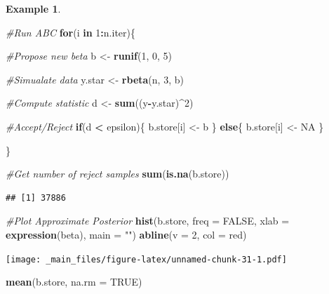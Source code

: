 \documentclass[
]{book}
\newenvironment{Shaded}{\begin{snugshade}}{\end{snugshade}}
\newcommand{\AttributeTok}[1]{\textcolor[rgb]{0.13,0.29,0.53}{#1}}
\newcommand{\CommentTok}[1]{\textcolor[rgb]{0.56,0.35,0.01}{\textit{#1}}}
\newcommand{\ConstantTok}[1]{\textcolor[rgb]{0.56,0.35,0.01}{#1}}
\newcommand{\ControlFlowTok}[1]{\textcolor[rgb]{0.13,0.29,0.53}{\textbf{#1}}}
\newcommand{\DecValTok}[1]{\textcolor[rgb]{0.00,0.00,0.81}{#1}}
\newcommand{\FunctionTok}[1]{\textcolor[rgb]{0.13,0.29,0.53}{\textbf{#1}}}
\newcommand{\NormalTok}[1]{#1}
\newcommand{\OtherTok}[1]{\textcolor[rgb]{0.56,0.35,0.01}{#1}}
\newcommand{\SpecialCharTok}[1]{\textcolor[rgb]{0.81,0.36,0.00}{\textbf{#1}}}
\newcommand{\StringTok}[1]{\textcolor[rgb]{0.31,0.60,0.02}{#1}}
\theoremstyle{definition}
\theoremstyle{definition}
\newtheorem{example}{Example}[chapter]
\theoremstyle{definition}
\theoremstyle{definition}
\theoremstyle{remark}
\begin{document}
\begin{example}
\begin{Shaded}
\begin{Highlighting}[]
\CommentTok{\#Run ABC}
\ControlFlowTok{for}\NormalTok{(i }\ControlFlowTok{in} \DecValTok{1}\SpecialCharTok{:}\NormalTok{n.iter)\{}
  
  \CommentTok{\#Propose new beta}
\NormalTok{  b }\OtherTok{\textless{}{-}} \FunctionTok{runif}\NormalTok{(}\DecValTok{1}\NormalTok{, }\DecValTok{0}\NormalTok{, }\DecValTok{5}\NormalTok{)}
  
  \CommentTok{\#Simualate data}
\NormalTok{  y.star }\OtherTok{\textless{}{-}} \FunctionTok{rbeta}\NormalTok{(n, }\DecValTok{3}\NormalTok{, b)}
  
  \CommentTok{\#Compute statistic}
\NormalTok{  d }\OtherTok{\textless{}{-}} \FunctionTok{sum}\NormalTok{((y}\SpecialCharTok{{-}}\NormalTok{y.star)}\SpecialCharTok{\^{}}\DecValTok{2}\NormalTok{)}
  
  \CommentTok{\#Accept/Reject}
  \ControlFlowTok{if}\NormalTok{(d }\SpecialCharTok{\textless{}}\NormalTok{ epsilon)\{}
\NormalTok{    b.store[i] }\OtherTok{\textless{}{-}}\NormalTok{ b}
\NormalTok{  \} }\ControlFlowTok{else}\NormalTok{\{}
\NormalTok{    b.store[i] }\OtherTok{\textless{}{-}} \ConstantTok{NA}
\NormalTok{  \}}
  
\NormalTok{\}}

\CommentTok{\#Get number of reject samples}
\FunctionTok{sum}\NormalTok{(}\FunctionTok{is.na}\NormalTok{(b.store))}
\end{Highlighting}
\end{Shaded}

\begin{verbatim}
## [1] 37886
\end{verbatim}

\begin{Shaded}
\begin{Highlighting}[]
\CommentTok{\#Plot Approximate Posterior}
\FunctionTok{hist}\NormalTok{(b.store, }\AttributeTok{freq =} \ConstantTok{FALSE}\NormalTok{, }\AttributeTok{xlab =} \FunctionTok{expression}\NormalTok{(beta), }\AttributeTok{main =} \StringTok{""}\NormalTok{)}
\FunctionTok{abline}\NormalTok{(}\AttributeTok{v =} \DecValTok{2}\NormalTok{, }\AttributeTok{col =} \StringTok{\textquotesingle{}red\textquotesingle{}}\NormalTok{)}
\end{Highlighting}
\end{Shaded}

\texttt{[image: \_main\_files/figure-latex/unnamed-chunk-31-1.pdf]}

\begin{Shaded}
\begin{Highlighting}[]
\FunctionTok{mean}\NormalTok{(b.store, }\AttributeTok{na.rm =} \ConstantTok{TRUE}\NormalTok{)}
\end{Highlighting}
\end{Shaded}


\end{example}
\end{document}
